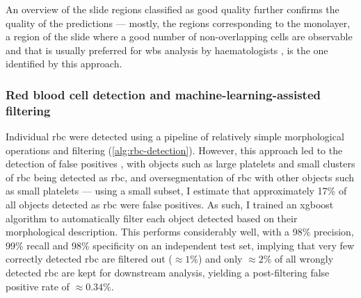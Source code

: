 An overview of the slide regions classified as good quality further confirms the quality of the predictions  --- mostly, the regions corresponding to the monolayer, a region of the slide where a good number of non-overlapping cells are observable and that is usually preferred for \ac{wbs} analysis by haematologists \cite{Adewoyin2014-vo}, is the one identified by this approach.

\begin{figure}[!ht]
    \label{fig:slide-quality-regions}
\end{figure}

\subsubsection{Red blood cell detection and machine-learning-assisted filtering}

Individual \ac{rbc} were detected using a pipeline of relatively simple morphological operations and filtering (\ref{alg:rbc-detection}). However, this approach led to the detection of false positives , with objects such as large platelets and small clusters of \ac{rbc} being detected as \ac{rbc}, and oversegmentation of \ac{rbc} with other objects such as small platelets --- using a small subset, I estimate that approximately 17\% of all objects detected as \ac{rbc} were false positives. As such, I trained an \ac{xgboost} algorithm to automatically filter each object detected based on their morphological description. This performs considerably well, with a 98\% precision, 99\% recall and 98\% specificity on an independent test set, implying that very few correctly detected \ac{rbc} are filtered out ($\approx 1\%$) and only $\approx 2\%$ of all wrongly detected \ac{rbc} are kept for downstream analysis, yielding a post-filtering false positive rate of $\approx 0.34\%$. 

\begin{figure}[!ht]
    \label{fig:rbc-filter-examples}
\end{figure}

